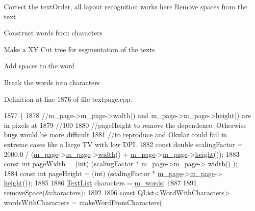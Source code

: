 Correct the text\+Order, all layout recognition works here Remove spaces from the text

Construct words from characters

Make a X\+Y Cut tree for segmentation of the texts

Add spaces to the word

Break the words into characters

Definition at line 1876 of file textpage.\+cpp.


\begin{DoxyCode}
1877 \{
1878     \textcolor{comment}{//m\_page->m\_page->width() and m\_page->m\_page->height() are in pixels at}
1879     \textcolor{comment}{//100%
1880     \textcolor{comment}{//pageHeight to remove the dependence. Otherwise bugs would be more difficult}
1881     \textcolor{comment}{//to reproduce and Okular could fail in extreme cases like a large TV with low DPI.}
1882     \textcolor{keyword}{const} \textcolor{keywordtype}{double} scalingFactor = 2000.0 / (\hyperlink{classOkular_1_1TextPagePrivate_a6662808b6ba334f5c7abc157759260b9}{m\_page}->\hyperlink{classOkular_1_1PagePrivate_a07c3e158a239c990c2ddcac53a6dd3c6}{m\_page}->\hyperlink{classOkular_1_1Page_a57114e88281da2a51b1bb0d5d4996d53}{width}() + 
      \hyperlink{classOkular_1_1TextPagePrivate_a6662808b6ba334f5c7abc157759260b9}{m\_page}->\hyperlink{classOkular_1_1PagePrivate_a07c3e158a239c990c2ddcac53a6dd3c6}{m\_page}->\hyperlink{classOkular_1_1Page_a67246a32b3e625946eb5c685b8372a4f}{height}());
1883     \textcolor{keyword}{const} \textcolor{keywordtype}{int} pageWidth  = (int) (scalingFactor * \hyperlink{classOkular_1_1TextPagePrivate_a6662808b6ba334f5c7abc157759260b9}{m\_page}->\hyperlink{classOkular_1_1PagePrivate_a07c3e158a239c990c2ddcac53a6dd3c6}{m\_page}->
      \hyperlink{classOkular_1_1Page_a57114e88281da2a51b1bb0d5d4996d53}{width}() );
1884     \textcolor{keyword}{const} \textcolor{keywordtype}{int} pageHeight = (int) (scalingFactor * \hyperlink{classOkular_1_1TextPagePrivate_a6662808b6ba334f5c7abc157759260b9}{m\_page}->\hyperlink{classOkular_1_1PagePrivate_a07c3e158a239c990c2ddcac53a6dd3c6}{m\_page}->
      \hyperlink{classOkular_1_1Page_a67246a32b3e625946eb5c685b8372a4f}{height}());
1885 
1886     \hyperlink{classQList}{TextList} characters = \hyperlink{classOkular_1_1TextPagePrivate_a36b703334a8775136cb4308209afd1cb}{m\_words};
1887 
1891     removeSpace(&characters);
1892 
1896     \textcolor{keyword}{const} \hyperlink{classQList}{QList<WordWithCharacters>} wordsWithCharacters = makeWordFromCharacters(
}
\end{DoxyCode}
